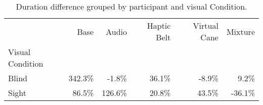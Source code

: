 
\begin{table}[!htb]
\centering
\caption{Duration difference grouped by participant and visual Condition.}
\label{tab:duracao_var_group}
\begin{tabular}{lrrrrr}
\toprule
{} &    Base &   Audio & Haptic Belt & Virtual Cane & Mixture \\
Visual Condition &         &         &             &              &         \\
\midrule
Blind            &  342.3\% &   -1.8\% &       36.1\% &        -8.9\% &    9.2\% \\
Sight            &   86.5\% &  126.6\% &       20.8\% &        43.5\% &  -36.1\% \\
\bottomrule
\end{tabular}
\end{table}

